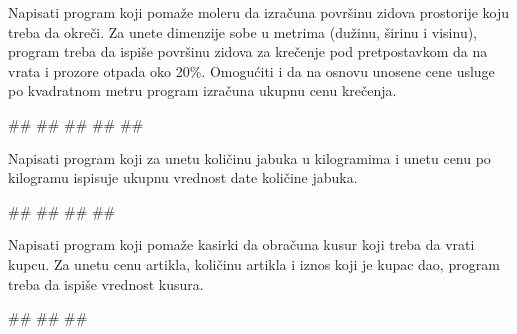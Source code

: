 \begin{Exercise}[label=p1_04] 
Napisati program koji pomaže moleru da izračuna površinu zidova
prostorije koju treba da okreči. Za unete dimenzije sobe u metrima (dužinu,
širinu i visinu), program treba da  ispiše površinu zidova za krečenje pod pretpostavkom da na vrata i prozore otpada oko 20\%. Omogućiti i da na osnovu 
unosene cene usluge po kvadratnom metru program izračuna ukupnu cenu krečenja.\\
\begin{miditest}
\begin{upotreba}{1}
#\naslovInt#
##
##
##
##
\end{upotreba}
\end{miditest}
\end{Exercise}
\begin{Answer}[ref=p1_04]
\end{Answer}



\begin{Exercise}[label=p1_05] 
Napisati program koji za unetu količinu jabuka u kilogramima i unetu
cenu po kilogramu ispisuje ukupnu vrednost date količine jabuka.\\
\begin{miditest}
\begin{upotreba}{1}
#\naslovInt#
##
##
##
\end{upotreba}
\end{miditest}
\end{Exercise}
\begin{Answer}[ref=p1_05]
\end{Answer}


\begin{Exercise}[label=p1_06] 
Napisati program koji pomaže kasirki da obračuna kusur koji treba da vrati kupcu. Za unetu cenu artikla, količinu artikla i iznos koji je kupac dao, program treba da ispiše vrednost kusura. \\
\begin{miditest}
\begin{upotreba}{1}
#\naslovInt#
##
##
\end{upotreba}
\end{miditest}
\end{Exercise}
\begin{Answer}[ref=p1_06]
\end{Answer}


